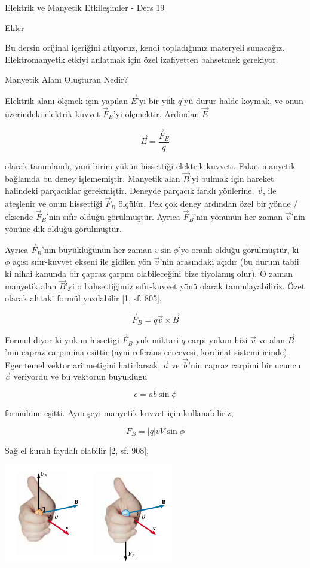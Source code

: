 \documentclass[12pt,fleqn]{article}\usepackage{../../common}
\begin{document}
Elektrik ve Manyetik Etkileşimler - Ders 19

Ekler

Bu dersin orijinal içeriğini atlıyoruz, kendi topladığımız materyeli
sunacağız. Elektromanyetik etkiyi anlatmak için özel izafiyetten bahsetmek
gerekiyor.

Manyetik Alanı Oluşturan Nedir?

Elektrik alanı ölçmek için yapılan $\vec{E}$'yi bir yük $q$'yü durur halde
koymak, ve onun üzerindeki elektrik kuvvet $\vec{F}_E$'yi ölçmektir. Ardindan
$\vec{E}$

$$
\vec{E} = \frac{\vec{F}_E}{q}
$$

olarak tanımlandı, yani birim yükün hissettiği elektrik kuvveti. Fakat manyetik
bağlamda bu deney işlememiştir. Manyetik alan $\vec{B}$'yi bulmak için hareket
halindeki parçacıklar gerekmiştir. Deneyde parçacık farklı yönlerine, $\vec{v}$,
ile ateşlenir ve onun hissettiği $\vec{F}_B$ ölçülür. Pek çok deney ardından
özel bir yönde / eksende $\vec{F}_B$'nin sıfır olduğu görülmüştür. Ayrıca
$\vec{F}_B$'nin yönünün her zaman $\vec{v}$'nin yönüne dik olduğu görülmüştür.

Ayrıca $\vec{F}_B$'nin büyüklüğünün her zaman $v \sin\phi$'ye oranlı olduğu
görülmüştür, ki $\phi$ açısı sıfır-kuvvet ekseni ile gidilen yön $\vec{v}$'nin
arasındaki açıdır (bu durum tabii ki nihai kanunda bir çapraz çarpım
olabileceğini bize tiyolamış olur). O zaman manyetik alan $\vec{B}$'yi o
bahsettiğimiz sıfır-kuvvet yönü olarak tanımlayabiliriz. Özet olarak alttaki
formül yazılabilir [1, sf. 805],

$$
\vec{F}_B = q \vec{v} \times \vec{B}
$$

Formul diyor ki yukun hissetigi $\vec{F}_B$ yuk miktari $q$ carpi yukun hizi
$\vec{v}$ ve alan $\vec{B}$'nin capraz carpimina esittir (ayni referans
cercevesi, kordinat sistemi icinde). Eger temel vektor aritmetigini hatirlarsak,
$\vec{a}$ ve $\vec{b}$'nin capraz carpimi bir ucuncu $\vec{c}$ veriyordu ve bu
vektorun buyuklugu

$$
c = a b \sin \phi
$$

formülüne eşitti. Aynı şeyi manyetik kuvvet için kullanabiliriz,

$$
F_B = |q| v V \sin\phi
$$

Sağ el kuralı faydalı olabilir [2, sf. 908],

\includegraphics[width=20em]{19_01.png}
\end{document}
